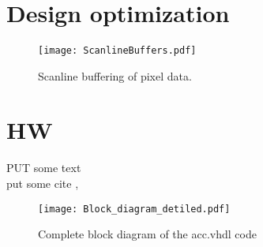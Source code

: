 \section{Design optimization}
\label{sec:Optimization}
\paragraph*{}

\begin{figure}[H]
	\centering
	\texttt{[image: ScanlineBuffers.pdf]}
	\caption{Scanline buffering of pixel data.}
	\label{fig:ScanlineBuffers}
\end{figure}


\section{HW}
\label{sec:hw}
PUT some text\\
put some cite \cite[p.11~eq.2.6]{Book}, \cite[p.11~eq.2.6]{Note}

\begin{figure}[H]
	\centering
	\texttt{[image: Block\_diagram\_detiled.pdf]}
	\caption{Complete block diagram of the acc.vhdl code}
	\label{fig:block_acc}
\end{figure}